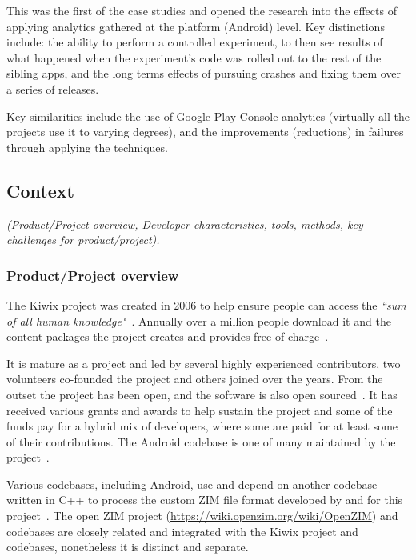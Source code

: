 This was the first of the case studies and opened the research into the effects of applying analytics gathered at the platform (Android) level. Key distinctions include: the ability to perform a controlled experiment, to then see results of what happened when the experiment’s code was rolled out to the rest of the sibling apps, and the long terms effects of pursuing crashes and fixing them over a series of releases.

Key similarities include the use of Google Play Console analytics (virtually all the projects use it to varying degrees), and the improvements (reductions) in failures through applying the techniques. 

\subsection{Context}
\textit{(Product/Project overview, Developer characteristics, tools, methods, key challenges for product/project).}

\subsubsection{Product/Project overview}
The Kiwix project was created in 2006 to help ensure people can access the \emph{``sum of all human knowledge"}~\citep{coillet2016-wikimedia-kiwix-ten-years}. Annually over a million people download it and the content packages the project creates and provides free of charge~\citep{coillet2016-wikimedia-kiwix-ten-years}.

It is mature as a project and led by several highly experienced contributors, two volunteers co-founded the project and others joined over the years. From the outset the project has been open, and the software is also open sourced~\citep{sutherland2014_wikimedia_on_kelson}. It has received various grants and awards to help sustain the project and some of the funds pay for a hybrid mix of developers, where some are paid for at least some of their contributions. The Android codebase is one of many maintained by the project~\citep{gaudin2017_wikimedia_kiwix_android}. 

Various codebases, including Android, use and depend on another codebase written in C++ to process the custom ZIM file format developed by and for this project~\citep{gaudin2017_wikimedia_kiwix_android}. The open ZIM project (\url{https://wiki.openzim.org/wiki/OpenZIM}) and codebases are closely related and integrated with the Kiwix project and codebases, nonetheless it is distinct and separate.

